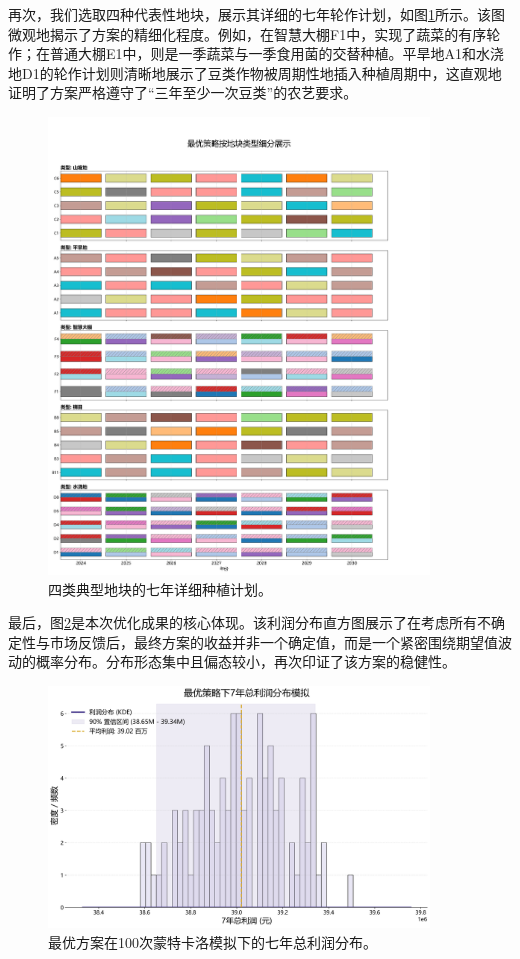 再次，我们选取四种代表性地块，展示其详细的七年轮作计划，如图\ref{fig:plot_plan}所示。该图微观地揭示了方案的精细化程度。例如，在智慧大棚F1中，实现了蔬菜的有序轮作；在普通大棚E1中，则是一季蔬菜与一季食用菌的交替种植。平旱地A1和水浇地D1的轮作计划则清晰地展示了豆类作物被周期性地插入种植周期中，这直观地证明了方案严格遵守了“三年至少一次豆类”的农艺要求。

\begin{figure}[H]
    \centering
    \includegraphics[width=0.9\textwidth]{figs/5问题三/典型地块种植计划图.png}
    \caption{四类典型地块的七年详细种植计划。}
    \label{fig:plot_plan}
\end{figure}

最后，图\ref{fig:profit_dist}是本次优化成果的核心体现。该利润分布直方图展示了在考虑所有不确定性与市场反馈后，最终方案的收益并非一个确定值，而是一个紧密围绕期望值波动的概率分布。分布形态集中且偏态较小，再次印证了该方案的稳健性。

\begin{figure}[H]
    \centering
    \includegraphics[width=0.9\textwidth]{figs/5问题三/利润分布图.png}
    \caption{最优方案在100次蒙特卡洛模拟下的七年总利润分布。}
    \label{fig:profit_dist}
\end{figure}



